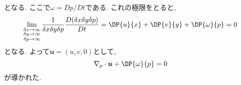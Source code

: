 \documentclass[a4j,12pt,openbib,oneside,dvipdfmx]{jarticle}
\begin{document}
となる. ここで$\omega=Dp/Dt$である. これの極限をとると,
\begin{equation}
  \lim_{\substack{\delta{x} \to \infty \\  \delta{y} \to \infty \\ \delta{p} \to \infty}} \frac{1}{\delta{x}\delta{y}\delta{p}}\frac{D{(\delta{x}\delta{y}\delta{p})}}{Dt}=\DP{u}{x}+\DP{v}{y}+\DP{\omega}{p}=0
\end{equation}
となる. よって$\bm{u}=(u,v,0)$として,
\begin{equation}
  \nabla_p\cdot\bm{u}+\DP{\omega}{p}=0
\end{equation}
が導かれた.
\end{document}
